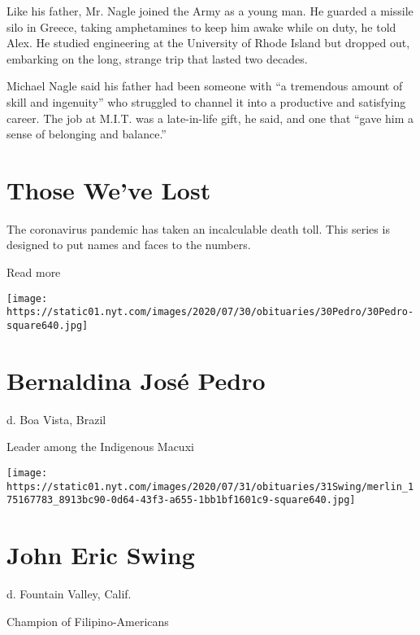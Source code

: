 Like his father, Mr. Nagle joined the Army as a young man. He guarded a
missile silo in Greece, taking amphetamines to keep him awake while on
duty, he told Alex. He studied engineering at the University of Rhode
Island but dropped out, embarking on the long, strange trip that lasted
two decades.

Michael Nagle said his father had been someone with ``a tremendous
amount of skill and ingenuity'' who struggled to channel it into a
productive and satisfying career. The job at M.I.T. was a late-in-life
gift, he said, and one that ``gave him a sense of belonging and
balance.''

\href{https://www.nytimes.com/interactive/2020/obituaries/people-died-coronavirus-obituaries.html?action=click\&pgtype=Article\&state=default\&region=BELOW_MAIN_CONTENT\&context=covid_obits_promo}{}

\hypertarget{those-weve-lost}{%
\section{Those We've Lost}\label{those-weve-lost}}

The coronavirus pandemic has taken an incalculable death toll. This
series is designed to put names and faces to the numbers.

Read more

\texttt{[image: https://static01.nyt.com/images/2020/07/30/obituaries/30Pedro/30Pedro-square640.jpg]}

\hypertarget{bernaldina-josuxe9-pedro}{%
\section{Bernaldina José Pedro}\label{bernaldina-josuxe9-pedro}}

d. Boa Vista, Brazil

Leader among the Indigenous Macuxi

\texttt{[image: https://static01.nyt.com/images/2020/07/31/obituaries/31Swing/merlin\_175167783\_8913bc90-0d64-43f3-a655-1bb1bf1601c9-square640.jpg]}

\hypertarget{john-eric-swing}{%
\section{John Eric Swing}\label{john-eric-swing}}

d. Fountain Valley, Calif.

Champion of Filipino-Americans

